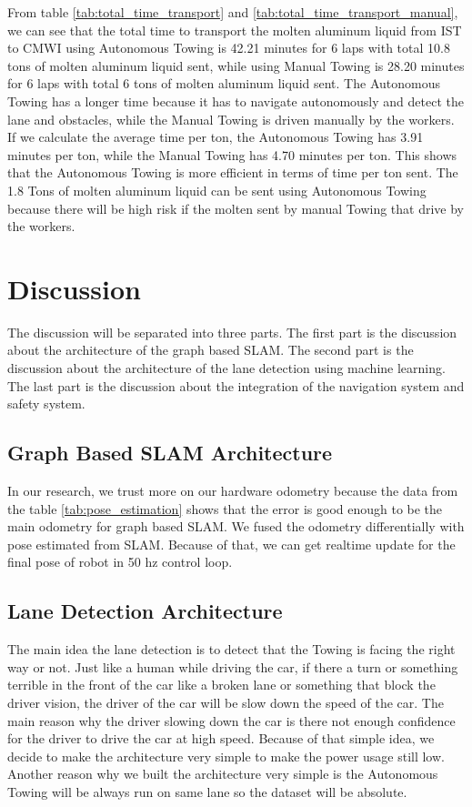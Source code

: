 \documentclass[conference]{IEEEtran}
\begin{document}
From table \ref{tab:total_time_transport} and \ref{tab:total_time_transport_manual}, we can see that the total time to transport the molten aluminum liquid from IST to CMWI using Autonomous Towing is 42.21 minutes for 6 laps with total 10.8 tons of molten aluminum liquid sent, while using Manual Towing is 28.20 minutes for 6 laps with total 6 tons of molten aluminum liquid sent. The Autonomous Towing has a longer time because it has to navigate autonomously and detect the lane and obstacles, while the Manual Towing is driven manually by the workers. If we calculate the average time per ton, the Autonomous Towing has 3.91 minutes per ton, while the Manual Towing has 4.70 minutes per ton. This shows that the Autonomous Towing is more efficient in terms of time per ton sent. The 1.8 Tons of molten aluminum liquid can be sent using Autonomous Towing because there will be high risk if the molten sent by manual Towing that drive by the workers.

\section{Discussion}
The discussion will be separated into three parts. The first part is the discussion about the architecture of the graph based SLAM. The second part is the discussion about the architecture of the lane detection using machine learning. The last part is the discussion about the integration of the navigation system and safety system. 

\subsection{Graph Based SLAM Architecture} 
In our research, we trust more on our hardware odometry because the data from the table \ref{tab:pose_estimation} shows that the error is good enough to be the main odometry for graph based SLAM. We fused the odometry differentially with pose estimated from SLAM. Because of that, we can get realtime update for the final pose of robot in 50 hz control loop.

\subsection{Lane Detection Architecture}
The main idea the lane detection is to detect that the Towing is facing the right way or not. Just like a human while driving the car, if there a turn or something terrible in the front of the car like a broken lane or something that block the driver vision, the driver of the car will be slow down the speed of the car. The main reason why the driver slowing down the car is there not enough confidence for the driver to drive the car at high speed. Because of that simple idea, we decide to make the architecture very simple to make the power usage still low. Another reason why we built the architecture very simple is the Autonomous Towing will be always run on same lane so the dataset will be absolute. 
\end{document}
